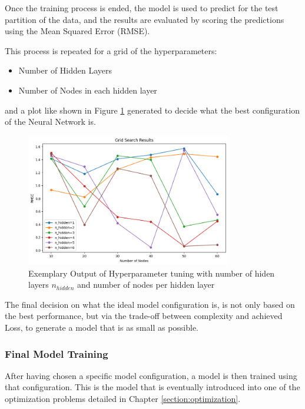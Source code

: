 Once the training process is ended, the model is used to predict for the test partition of the data, and the results are evaluated by scoring the predictions using the Mean Squared Error (RMSE). 

This process is repeated for a grid of the hyperparameters:
\begin{itemize}
	\item Number of Hidden Layers
	\item Number of Nodes in each hidden layer
\end{itemize}

and a plot like shown in Figure	\ref{fig:hyperparm} generated to decide what the best configuration of the Neural Network is. 

\begin{figure}[h] 
	\centering
	\includegraphics[width=0.8\textwidth]{../figures/modelling/hyperparm.png} 
	\caption{Exemplary Output of Hyperparameter tuning with number of hiden layers $n_{hidden} $ and number of nodes per hidden layer}
	\label{fig:hyperparm}
\end{figure}

The final decision on what the ideal model configuration is, is not only based on the best performance, but via the trade-off between complexity and achieved Loss, to generate a model that is as small as possible.


\subsubsection{Final Model Training}

After having chosen a specific model configuration, a model is then trained using that configuration. This is the model that is eventually introduced into one of the optimization problems detailed in Chapter \ref{section:optimization}.


